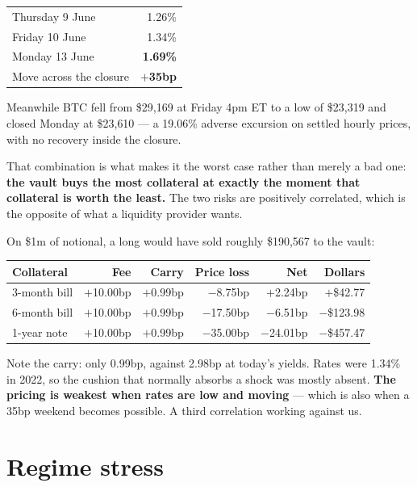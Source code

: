 \documentclass[11pt,a4paper]{article}
\begin{document}
\begin{center}
\small
\begin{tabular}{@{}lr@{}}
\toprule
Thursday 9 June & 1.26\% \\
Friday 10 June & 1.34\% \\
Monday 13 June & \textbf{1.69\%} \\
\midrule
Move across the closure & \textbf{$+$35bp} \\
\bottomrule
\end{tabular}
\end{center}

Meanwhile BTC fell from \$29{,}169 at Friday 4pm ET to a low of \$23{,}319 and closed
Monday at \$23{,}610 — a 19.06\% adverse excursion on settled hourly prices, with no
recovery inside the closure.

That combination is what makes it the worst case rather than merely a bad one: \textbf{the
vault buys the most collateral at exactly the moment that collateral is worth the least.}
The two risks are positively correlated, which is the opposite of what a liquidity
provider wants.

On \$1m of notional, a long would have sold roughly \$190{,}567 to the vault:

\begin{center}
\small
\begin{tabular}{@{}lrrrrr@{}}
\toprule
\textbf{Collateral} & \textbf{Fee} & \textbf{Carry} & \textbf{Price loss} & \textbf{Net} & \textbf{Dollars} \\
\midrule
3-month bill & $+$10.00bp & $+$0.99bp & $-$8.75bp & $+$2.24bp & $+$\$42.77 \\
6-month bill & $+$10.00bp & $+$0.99bp & $-$17.50bp & $-$6.51bp & $-$\$123.98 \\
1-year note  & $+$10.00bp & $+$0.99bp & $-$35.00bp & $-$24.01bp & $-$\$457.47 \\
\bottomrule
\end{tabular}
\end{center}

Note the carry: only 0.99bp, against 2.98bp at today's yields. Rates were 1.34\% in 2022,
so the cushion that normally absorbs a shock was mostly absent. \textbf{The pricing is
weakest when rates are low and moving} — which is also when a 35bp weekend becomes
possible. A third correlation working against us.

\section{Regime stress}
\label{sec:regimes}
\end{document}
